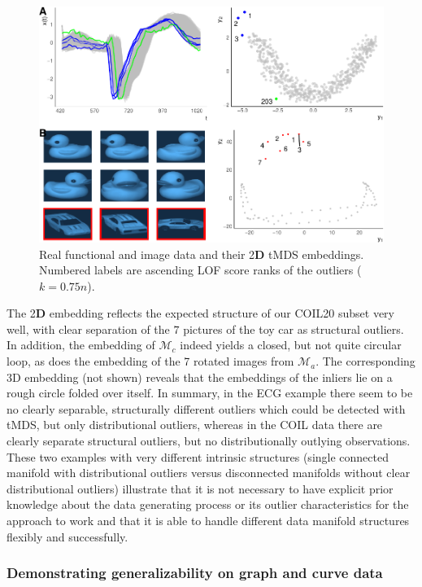 \documentclass[
  10pt]{article}
\newcommand{\vizdim}{\mathbf{D}}        %
\newcommand{\co}{c}
\newcommand{\an}{a}
\newcommand{\Min}{\mathcal{M}_{\co}}
\newcommand{\Man}{\mathcal{M}_{\an}}
\begin{document}
\begin{figure}
\centering
\includegraphics{00_paper_wires_files/figure-latex/fda-image-real-1.pdf}
\caption{\label{fig:fda-image-real}\label{fig:fda-image-real} Real functional and image data and their 2\(\vizdim\) tMDS embeddings. Numbered labels are ascending LOF score ranks of the outliers (\(k = 0.75n\)).}
\end{figure}

The 2\(\vizdim\) embedding reflects the expected structure of our COIL20 subset very well, with clear separation of the \(7\) pictures of the toy car as structural outliers. In addition, the embedding of \(\Min\) indeed yields a closed, but not quite circular loop, as does the embedding of the 7 rotated images from \(\Man\). The corresponding 3D embedding (not shown) reveals that the embeddings of the inliers lie on a rough circle folded over itself.
In summary, in the ECG example there seem to be no clearly separable, structurally different outliers which could be detected with tMDS, but only distributional outliers, whereas in the COIL data there are clearly separate structural outliers, but no distributionally outlying observations. These two examples with very different intrinsic structures (single connected manifold with distributional outliers versus disconnected manifolds without clear distributional outliers) illustrate that it is not necessary to have explicit prior knowledge about the data generating process or its outlier characteristics for the approach to work and that it is able to handle different data manifold structures flexibly and successfully.

\subsubsection{Demonstrating generalizability on graph and curve data}
\end{document}
